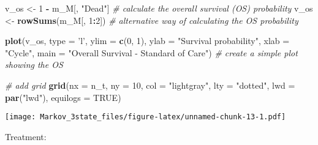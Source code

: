 \documentclass[
]{article}
\newenvironment{Shaded}{\begin{snugshade}}{\end{snugshade}}
\newcommand{\CommentTok}[1]{\textcolor[rgb]{0.56,0.35,0.01}{\textit{#1}}}
\newcommand{\DataTypeTok}[1]{\textcolor[rgb]{0.13,0.29,0.53}{#1}}
\newcommand{\DecValTok}[1]{\textcolor[rgb]{0.00,0.00,0.81}{#1}}
\newcommand{\KeywordTok}[1]{\textcolor[rgb]{0.13,0.29,0.53}{\textbf{#1}}}
\newcommand{\NormalTok}[1]{#1}
\newcommand{\OperatorTok}[1]{\textcolor[rgb]{0.81,0.36,0.00}{\textbf{#1}}}
\newcommand{\OtherTok}[1]{\textcolor[rgb]{0.56,0.35,0.01}{#1}}
\newcommand{\StringTok}[1]{\textcolor[rgb]{0.31,0.60,0.02}{#1}}
\begin{document}
\begin{Shaded}
\begin{Highlighting}[]
\NormalTok{v_os <-}\StringTok{ }\DecValTok{1} \OperatorTok{-}\StringTok{ }\NormalTok{m_M[, }\StringTok{"Dead"}\NormalTok{]             }\CommentTok{# calculate the overall survival (OS) probability}
\NormalTok{v_os <-}\StringTok{ }\KeywordTok{rowSums}\NormalTok{(m_M[, }\DecValTok{1}\OperatorTok{:}\DecValTok{2}\NormalTok{])           }\CommentTok{# alternative way of calculating the OS probability   }

\KeywordTok{plot}\NormalTok{(v_os, }\DataTypeTok{type =} \StringTok{'l'}\NormalTok{, }
     \DataTypeTok{ylim =} \KeywordTok{c}\NormalTok{(}\DecValTok{0}\NormalTok{, }\DecValTok{1}\NormalTok{),}
     \DataTypeTok{ylab =} \StringTok{"Survival probability"}\NormalTok{,}
     \DataTypeTok{xlab =} \StringTok{"Cycle"}\NormalTok{,}
     \DataTypeTok{main =} \StringTok{"Overall Survival - Standard of Care"}\NormalTok{)       }\CommentTok{# create a simple plot showing the OS}

\CommentTok{# add grid }
\KeywordTok{grid}\NormalTok{(}\DataTypeTok{nx =}\NormalTok{ n_t, }\DataTypeTok{ny =} \DecValTok{10}\NormalTok{, }\DataTypeTok{col =} \StringTok{"lightgray"}\NormalTok{, }\DataTypeTok{lty =} \StringTok{"dotted"}\NormalTok{, }\DataTypeTok{lwd =} \KeywordTok{par}\NormalTok{(}\StringTok{"lwd"}\NormalTok{), }
     \DataTypeTok{equilogs =} \OtherTok{TRUE}\NormalTok{) }
\end{Highlighting}
\end{Shaded}

\texttt{[image: Markov\_3state\_files/figure-latex/unnamed-chunk-13-1.pdf]}

Treatment:
\end{document}
